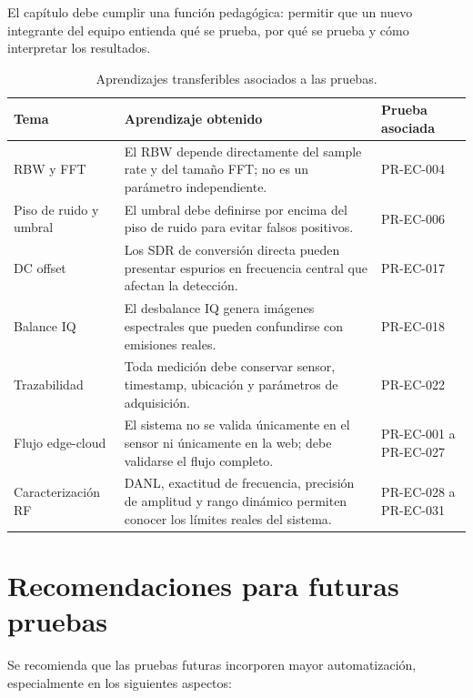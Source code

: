 El capítulo debe cumplir una función pedagógica: permitir que un nuevo integrante del equipo entienda qué se prueba, por qué se prueba y cómo interpretar los resultados.

\begin{table}[H]
\centering
\caption{Aprendizajes transferibles asociados a las pruebas.}
\label{tab:transferencia-conocimiento-pruebas}
\small
\setlength{\tabcolsep}{3pt}
\begin{tabularx}{\textwidth}{|>{\raggedright\arraybackslash}p{3.2cm}|>{\raggedright\arraybackslash}X|>{\raggedright\arraybackslash}p{3.4cm}|}
\hline
\textbf{Tema} & \textbf{Aprendizaje obtenido} & \textbf{Prueba asociada} \\
\hline
RBW y FFT & El RBW depende directamente del sample rate y del tamaño FFT; no es un parámetro independiente. & PR-EC-004 \\
\hline
Piso de ruido y umbral & El umbral debe definirse por encima del piso de ruido para evitar falsos positivos. & PR-EC-006 \\
\hline
DC offset & Los SDR de conversión directa pueden presentar espurios en frecuencia central que afectan la detección. & PR-EC-017 \\
\hline
Balance IQ & El desbalance IQ genera imágenes espectrales que pueden confundirse con emisiones reales. & PR-EC-018 \\
\hline
Trazabilidad & Toda medición debe conservar sensor, timestamp, ubicación y parámetros de adquisición. & PR-EC-022 \\
\hline
Flujo edge-cloud & El sistema no se valida únicamente en el sensor ni únicamente en la web; debe validarse el flujo completo. & PR-EC-001 a PR-EC-027 \\
\hline
Caracterización RF & DANL, exactitud de frecuencia, precisión de amplitud y rango dinámico permiten conocer los límites reales del sistema. & PR-EC-028 a PR-EC-031 \\
\hline
\end{tabularx}
\end{table}

\section{Recomendaciones para futuras pruebas}

Se recomienda que las pruebas futuras incorporen mayor automatización, especialmente en los siguientes aspectos:

